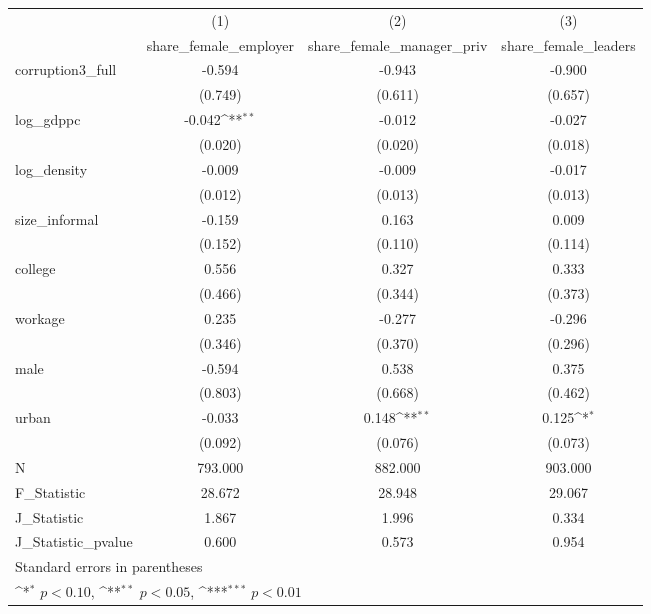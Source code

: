 {
\def\sym#1{\ifmmode^{#1}\else\(^{#1}\)\fi}
\begin{tabular}{l*{3}{c}}
\hline\hline
            &\multicolumn{1}{c}{(1)}&\multicolumn{1}{c}{(2)}&\multicolumn{1}{c}{(3)}\\
            &\multicolumn{1}{c}{share\_female\_employer}&\multicolumn{1}{c}{share\_female\_manager\_priv}&\multicolumn{1}{c}{share\_female\_leaders}\\
\hline
corruption3\_full&      -0.594         &      -0.943         &      -0.900         \\
            &     (0.749)         &     (0.611)         &     (0.657)         \\
[1em]
log\_gdppc   &      -0.042\sym{**} &      -0.012         &      -0.027         \\
            &     (0.020)         &     (0.020)         &     (0.018)         \\
[1em]
log\_density &      -0.009         &      -0.009         &      -0.017         \\
            &     (0.012)         &     (0.013)         &     (0.013)         \\
[1em]
size\_informal&      -0.159         &       0.163         &       0.009         \\
            &     (0.152)         &     (0.110)         &     (0.114)         \\
[1em]
college     &       0.556         &       0.327         &       0.333         \\
            &     (0.466)         &     (0.344)         &     (0.373)         \\
[1em]
workage     &       0.235         &      -0.277         &      -0.296         \\
            &     (0.346)         &     (0.370)         &     (0.296)         \\
[1em]
male        &      -0.594         &       0.538         &       0.375         \\
            &     (0.803)         &     (0.668)         &     (0.462)         \\
[1em]
urban       &      -0.033         &       0.148\sym{**} &       0.125\sym{*}  \\
            &     (0.092)         &     (0.076)         &     (0.073)         \\
\hline
N           &     793.000         &     882.000         &     903.000         \\
F\_Statistic &      28.672         &      28.948         &      29.067         \\
J\_Statistic &       1.867         &       1.996         &       0.334         \\
J\_Statistic\_pvalue&       0.600         &       0.573         &       0.954         \\
\hline\hline
\multicolumn{4}{l}{\footnotesize Standard errors in parentheses}\\
\multicolumn{4}{l}{\footnotesize \sym{*} \(p<0.10\), \sym{**} \(p<0.05\), \sym{***} \(p<0.01\)}\\
\end{tabular}
}
